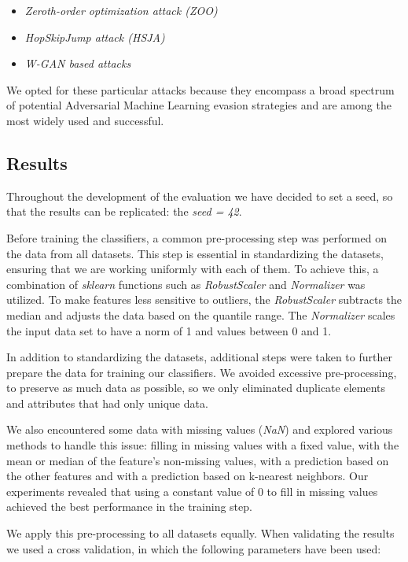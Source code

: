 \begin{itemize}
    \item \textit{Zeroth-order optimization attack (ZOO)}~\cite{chen2017zoo}
    \item \textit{HopSkipJump attack (HSJA)}~\cite{chen2020hopskipjumpattack}
    \item \textit{W-GAN based attacks}~\cite{lin2022idsgan}
\end{itemize}

We opted for these particular attacks because they encompass a broad spectrum of potential Adversarial Machine Learning
evasion strategies and are among the most widely used and successful.

\subsection{Results}

Throughout the development of the evaluation we have decided to set a seed, so that the results can be replicated: the \textit{seed = 42}.

Before training the classifiers, a common pre-processing step was performed on the data from all datasets.
This step is essential in standardizing the datasets, ensuring that we are working uniformly with each of them.
To achieve this, a combination of \textit{sklearn} functions such as \textit{RobustScaler} and \textit{Normalizer}
was utilized.
To make features less sensitive to outliers, the \textit{RobustScaler} subtracts the median and adjusts the data based on the quantile range.
The \textit{Normalizer} scales the input data set to have a norm of 1 and values between 0 and 1.

In addition to standardizing the datasets, additional steps were taken to further prepare the data for training our
classifiers. We avoided excessive pre-processing, to preserve as much data as possible, so we only eliminated duplicate elements and attributes that had only unique data.

We also encountered some data with missing values (\textit{NaN}) and explored various methods to handle this issue:
filling in missing values with a fixed value, with the mean or median of the feature's non-missing values,
with a prediction based on the other features and with a prediction based on k-nearest neighbors.
Our experiments revealed that using a constant value of 0 to fill in missing values achieved the best performance in the training step.

We apply this pre-processing to all datasets equally.
When validating the results we used a cross validation, in which the following parameters have been used:

